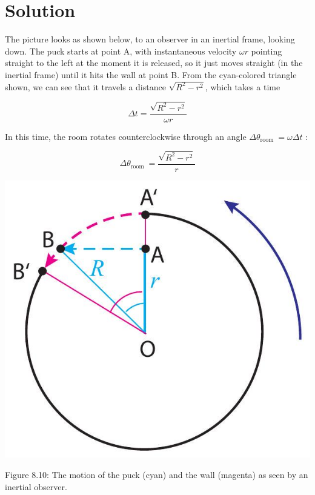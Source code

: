 \documentclass[10pt]{article}
\begin{document}
\section*{Solution}
The picture looks as shown below, to an observer in an inertial frame, looking down. The puck starts at point A, with instantaneous velocity $\omega r$ pointing straight to the left at the moment it is released, so it just moves straight (in the inertial frame) until it hits the wall at point B. From the cyan-colored triangle shown, we can see that it travels a distance $\sqrt{R^{2}-r^{2}}$, which takes a time


\begin{equation*}
\Delta t=\frac{\sqrt{R^{2}-r^{2}}}{\omega r} \tag{8.62}
\end{equation*}


In this time, the room rotates counterclockwise through an angle $\Delta \theta_{\text {room }}=\omega \Delta t$ :


\begin{equation*}
\Delta \theta_{\text {room }}=\frac{\sqrt{R^{2}-r^{2}}}{r} \tag{8.63}
\end{equation*}


\begin{center}
\includegraphics[max width=\textwidth]{2024_09_14_9969b06773f10b6936e8g-202}
\end{center}

Figure 8.10: The motion of the puck (cyan) and the wall (magenta) as seen by an inertial observer.
\end{document}
